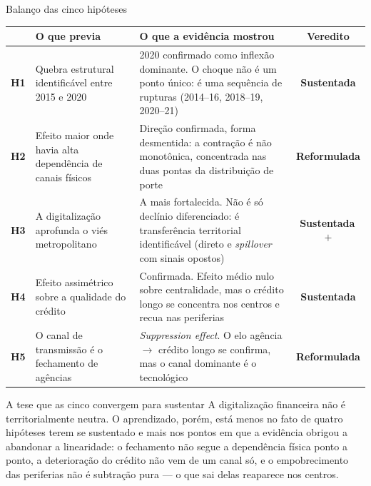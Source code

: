 \documentclass[aspectratio=169,10pt]{beamer}
\newcommand{\dest}[1]{\textcolor{cedlaranja}{\textbf{#1}}}
\newcommand{\pos}[1]{\textcolor{cedverde}{\textbf{#1}}}
\begin{document}
\begin{frame}{Balanço das cinco hipóteses}
  \centering
  \scriptsize
  \begin{tabular}{@{}cP{0.30\textwidth}P{0.44\textwidth}c@{}}
    \toprule
    & \textbf{O que previa} & \textbf{O que a evidência mostrou} & \textbf{Veredito}\\
    \midrule
    \dest{H1} & Quebra estrutural identificável entre 2015 e 2020 &
      2020 confirmado como inflexão dominante. O choque não é um ponto único: é uma
      sequência de rupturas (2014--16, 2018--19, 2020--21) & \pos{Sustentada}\\
    \addlinespace
    \dest{H2} & Efeito maior onde havia alta dependência de canais físicos &
      Direção confirmada, forma desmentida: a contração é não monotônica,
      concentrada nas duas pontas da distribuição de porte & \dest{Reformulada}\\
    \addlinespace
    \dest{H3} & A digitalização aprofunda o viés metropolitano &
      A mais fortalecida. Não é só declínio diferenciado: é transferência
      territorial identificável (direto e \emph{spillover} com sinais opostos) &
      \pos{Sustentada\,$+$}\\
    \addlinespace
    \dest{H4} & Efeito assimétrico sobre a qualidade do crédito &
      Confirmada. Efeito médio nulo sobre centralidade, mas o crédito longo se
      concentra nos centros e recua nas periferias & \pos{Sustentada}\\
    \addlinespace
    \dest{H5} & O canal de transmissão é o fechamento de agências &
      \emph{Suppression effect}. O elo agência $\rightarrow$ crédito longo se
      confirma, mas o canal dominante é o tecnológico & \dest{Reformulada}\\
    \bottomrule
  \end{tabular}

  \vspace{0.5em}
  \begin{alertblock}{A tese que as cinco convergem para sustentar}
    \footnotesize A digitalização financeira \alert{não é territorialmente neutra}.
    O aprendizado, porém, está menos no fato de quatro hipóteses terem se sustentado
    e mais nos pontos em que a evidência obrigou a abandonar a linearidade: o
    fechamento não segue a dependência física ponto a ponto, a deterioração do
    crédito não vem de um canal só, e o empobrecimento das periferias não é
    subtração pura --- o que sai delas reaparece nos centros.
  \end{alertblock}
\end{frame}
\end{document}
